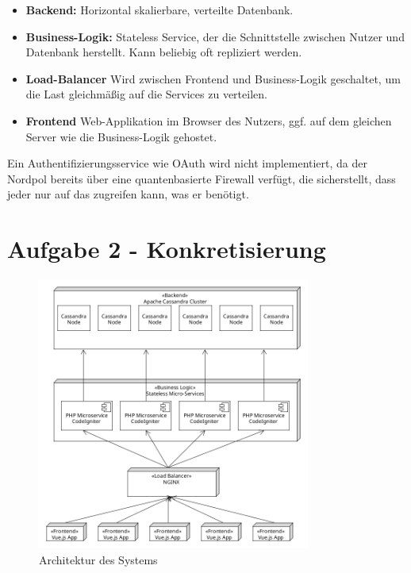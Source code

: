 \documentclass[12pt]{article}
\begin{document}
\begin{itemize}
	\item \textbf{Backend:} Horizontal skalierbare, verteilte Datenbank.
	\item \textbf{Business-Logik:} Stateless Service, der die Schnittstelle zwischen Nutzer und Datenbank herstellt. Kann beliebig oft repliziert werden.
	\item \textbf{Load-Balancer} Wird zwischen Frontend und Business-Logik geschaltet, um die Last gleichmäßig auf die Services zu verteilen.
	\item \textbf{Frontend} Web-Applikation im Browser des Nutzers, ggf. auf dem gleichen Server wie die Business-Logik gehostet.
\end{itemize}

Ein Authentifizierungsservice wie OAuth wird nicht implementiert, da der Nordpol bereits über eine quantenbasierte Firewall verfügt, die sicherstellt, dass jeder nur auf das zugreifen kann, was er benötigt.

\section*{Aufgabe 2 - Konkretisierung}

\begin{figure}[H]
	\centering
	\includegraphics[width=0.8\textwidth]{./img/architecture}
	\caption{Architektur des Systems}
\end{figure}
\end{document}
